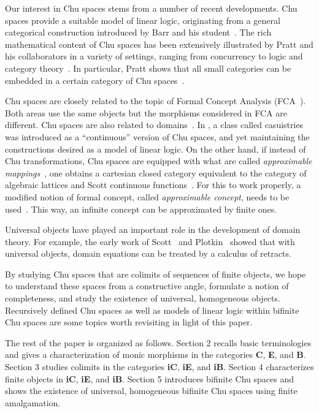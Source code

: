 \documentclass{LMCS}
\begin{document}
Our interest in Chu spaces stems from a number of recent developments.
Chu spaces provide a suitable model of linear logic, originating from
a general categorical construction introduced by Barr and his
student~\cite{barr1,barr2}.  The rich mathematical content of Chu
spaces has been extensively illustrated by Pratt and his collaborators
in a variety of settings, ranging from concurrency to logic and
category theory~\cite{pratt1,pratt2,pratt3,pratt4,pratt6,pratt7}.  In
particular, Pratt shows that all small categories can be embedded in
a certain category of Chu spaces~\cite{pratt5}.

Chu spaces are closely related to the topic of Formal Concept
Analysis (FCA~\cite{ganter,zhang-mfps}).  Both areas use the same
objects but the morphisms considered in FCA are different.
Chu spaces are also related to domains~\cite{zhang-mfps}.  In
\cite{lamarche}, a class called casuistries was introduced as a
``continuous'' version of Chu spaces, and yet maintaining the
constructions desired as a model of linear logic. On the other hand,
if instead of Chu transformations, Chu spaces are equipped with what
are called {\em approximable mappings}~\cite{pascal,scott}, one
obtains a cartesian closed category equivalent to the category of
algebraic lattices and Scott continuous functions~\cite{alga}. For
this to work properly, a modified notion of formal concept, called
{\em approximable concept}, needs to be used~\cite{tac}. This way, an
infinite concept can be approximated by finite ones.

Universal objects have played an important role in the development of
domain theory. For example,
the early work of Scott~\cite{scott76} and Plotkin~\cite{plotkin78}
showed that with universal objects, domain equations can be
treated by a calculus of retracts.

By studying Chu spaces that  are colimits of sequences of finite objects,
we hope to understand these spaces from a constructive angle, formulate a notion of
completeness, and study the existence of universal, homogeneous objects.
Recursively defined Chu spaces as well as models of linear logic within bifinite Chu
spaces are some topics worth revisiting in light of this paper.

\smallskip

The rest of the paper is organized as follows. Section 2 recalls basic terminologies and
gives a  characterization of monic morphisms in the categories {\bf C}, {\bf E}, and {\bf B}.
Section 3 studies colimits in the categories  {\bf iC}, {\bf iE}, and {\bf iB}.
Section 4 characterizes finite objects in  {\bf iC}, {\bf iE}, and {\bf iB}.
Section 5 introduces bifinite Chu spaces
and shows the existence of universal, homogeneous bifinite Chu spaces using
finite amalgamation.  
\end{document}
